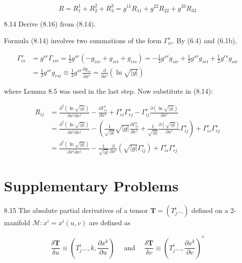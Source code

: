 \documentclass[10pt]{article}
\begin{document}
$$
R=R_{1}^{1}+R_{2}^{2}+R_{3}^{3}=g^{11} R_{11}+g^{22} R_{22}+g^{33} R_{33}
$$

8.14 Derive (8.16) from (8.14).

Formula (8.14) involves two summations of the form $\Gamma_{i s}^{s}$. By (6.4) and (6.1b),

$$
\begin{aligned}
\Gamma_{i s}^{s} & =g^{s r} \Gamma_{i s r}=\frac{1}{2} g^{s r}\left(-g_{i s r}+g_{s r i}+g_{r i s}\right)=-\frac{1}{2} g^{s r} g_{s i r}+\frac{1}{2} g^{s r} g_{s r i}+\frac{1}{2} g^{r s} g_{s i r} \\
& =\frac{1}{2} g^{s r} g_{r s i} \equiv \frac{1}{2} g^{s r} \frac{\partial g_{r s}}{\partial x^{i}}=\frac{\partial}{\partial x^{i}}(\ln \sqrt{|g|})
\end{aligned}
$$

where Lemma 8.5 was used in the last step. Now substitute in (8.14):

$$
\begin{aligned}
R_{i j} & =\frac{\partial^{2}(\ln \sqrt{|g|})}{\partial x^{i} \partial x^{j}}-\frac{\partial \Gamma_{i j}^{s}}{\partial x^{s}}+\Gamma_{i s}^{r} \Gamma_{r j}^{s}-\Gamma_{i j}^{r} \frac{\partial(\ln \sqrt{|g|})}{\partial x^{r}} \\
& =\frac{\partial^{2}(\ln \sqrt{|g|})}{\partial x^{i} \partial x^{j}}-\left(\frac{1}{\sqrt{|g|}} \sqrt{|g|} \frac{\partial \Gamma_{i j}^{s}}{\partial x^{s}}+\frac{1}{\sqrt{|g|}} \frac{\partial(\sqrt{|g|})}{\partial x^{s}} \Gamma_{i j}^{s}\right)+\Gamma_{i s}^{r} \Gamma_{r j}^{s} \\
& =\frac{\partial^{2}(\ln \sqrt{|g|})}{\partial x^{i} \partial x^{j}}-\frac{1}{\sqrt{|g|}} \frac{\partial}{\partial x^{s}}\left(\sqrt{|g|} \Gamma_{i j}^{s}\right)+\Gamma_{i s}^{r} \Gamma_{r j}^{s}
\end{aligned}
$$

\section*{Supplementary Problems}
8.15 The absolute partial derivatives of a tensor $\mathbf{T}=\left(T_{j}^{i} \ldots\right)$ defined on a 2-manifold $\mathscr{M}: x^{i}=x^{i}(u, v)$ are defined as

$$
\frac{\delta \mathbf{T}}{\delta u} \equiv\left(T_{j}^{i} \ldots, k, \frac{\partial x^{k}}{\partial u}\right) \quad \text { and } \quad \frac{\delta \mathbf{T}}{\delta v} \equiv\left(T_{j}^{i} \ldots, \frac{\partial x^{k}}{\partial v}\right)^{\dot{*}}
$$
\end{document}
